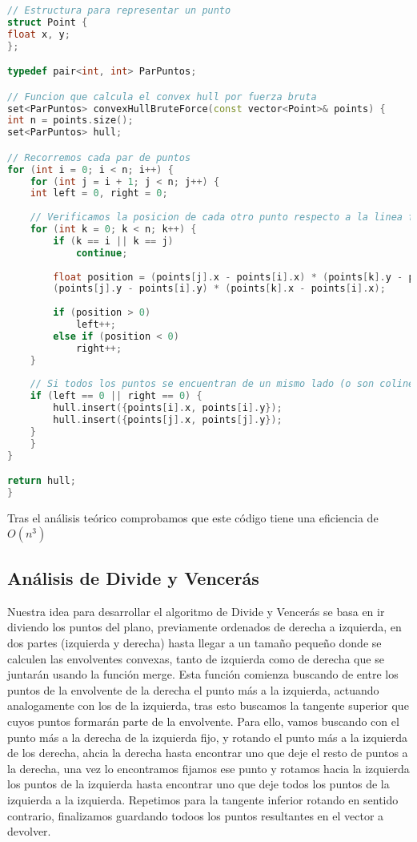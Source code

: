 \documentclass[a4paper,12pt]{article}
\begin{document}
\begin{lstlisting}[language=C++, caption={Brute Force de \textbf{``La envolvente convexa''}}]
// Estructura para representar un punto
struct Point {
float x, y;
};

typedef pair<int, int> ParPuntos;

// Funcion que calcula el convex hull por fuerza bruta
set<ParPuntos> convexHullBruteForce(const vector<Point>& points) {
int n = points.size();
set<ParPuntos> hull;

// Recorremos cada par de puntos
for (int i = 0; i < n; i++) {
	for (int j = i + 1; j < n; j++) {
	int left = 0, right = 0;
	
	// Verificamos la posicion de cada otro punto respecto a la linea formada por points[i] y points[j]
	for (int k = 0; k < n; k++) {
		if (k == i || k == j)
			continue;
			
		float position = (points[j].x - points[i].x) * (points[k].y - points[i].y) -
		(points[j].y - points[i].y) * (points[k].x - points[i].x);
		
		if (position > 0)
			left++;
		else if (position < 0)
			right++;
	}
	
	// Si todos los puntos se encuentran de un mismo lado (o son colineales), se adjuntan los puntos de la arista
	if (left == 0 || right == 0) {
		hull.insert({points[i].x, points[i].y});
		hull.insert({points[j].x, points[j].y});
	}
	}
}

return hull;
}
\end{lstlisting}

Tras el análisis teórico comprobamos que este código tiene una eficiencia de $O(n^3)$

\subsection{Análisis de Divide y Vencerás}
Nuestra idea para desarrollar el algoritmo de Divide y Vencerás se basa en ir diviendo los puntos del plano, previamente ordenados 
de derecha a izquierda, en dos partes (izquierda y derecha) hasta llegar a un tamaño pequeño donde se calculen las envolventes convexas,
tanto de izquierda como de derecha que se juntarán usando la función merge. Esta función comienza buscando de entre los puntos de la envolvente de la derecha 
el punto más a la izquierda, actuando analogamente con los de la izquierda, tras esto buscamos la tangente superior que cuyos puntos 
formarán parte de la envolvente. Para ello, vamos buscando con el punto más a la derecha de la izquierda fijo, y rotando el punto más a la 
izquierda de los derecha, ahcia la derecha hasta encontrar uno que deje el resto de puntos a la derecha, una vez lo encontramos fijamos 
ese punto y rotamos hacia la izquierda los puntos de la izquierda hasta encontrar uno que deje todos los puntos de la izquierda a la izquierda.
Repetimos para la tangente inferior rotando en sentido contrario, finalizamos guardando todoos los puntos resultantes en el vector a devolver. \\
\end{document}
